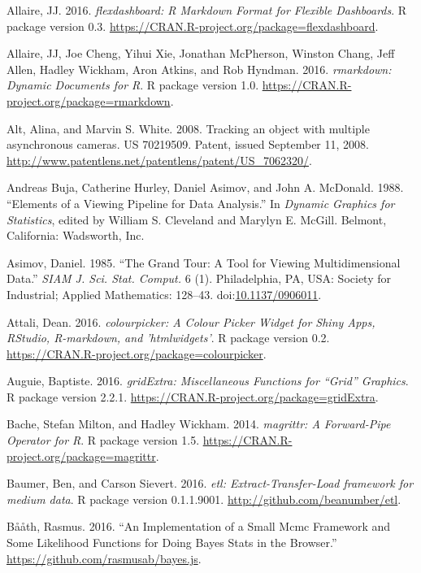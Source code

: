 \documentclass[12pt,]{isuthesis}
\begin{document}
\hypertarget{ref-flexdashboard}{}
Allaire, JJ. 2016. \emph{flexdashboard: R Markdown Format for Flexible
Dashboards}. R package version 0.3.
\url{https://CRAN.R-project.org/package=flexdashboard}.

\hypertarget{ref-rmarkdown}{}
Allaire, JJ, Joe Cheng, Yihui Xie, Jonathan McPherson, Winston Chang,
Jeff Allen, Hadley Wickham, Aron Atkins, and Rob Hyndman. 2016.
\emph{rmarkdown: Dynamic Documents for R}. R package version 1.0.
\url{https://CRAN.R-project.org/package=rmarkdown}.

\hypertarget{ref-patent}{}
Alt, Alina, and Marvin S. White. 2008. Tracking an object with multiple
asynchronous cameras. US 70219509. Patent, issued September 11, 2008.
\url{http://www.patentlens.net/patentlens/patent/US_7062320/}.

\hypertarget{ref-viewing-pipeline}{}
Andreas Buja, Catherine Hurley, Daniel Asimov, and John A. McDonald.
1988. ``Elements of a Viewing Pipeline for Data Analysis.'' In
\emph{Dynamic Graphics for Statistics}, edited by William S. Cleveland
and Marylyn E. McGill. Belmont, California: Wadsworth, Inc.

\hypertarget{ref-grand-tour}{}
Asimov, Daniel. 1985. ``The Grand Tour: A Tool for Viewing
Multidimensional Data.'' \emph{SIAM J. Sci. Stat. Comput.} 6 (1).
Philadelphia, PA, USA: Society for Industrial; Applied Mathematics:
128--43. doi:\href{https://doi.org/10.1137/0906011}{10.1137/0906011}.

\hypertarget{ref-colourpicker}{}
Attali, Dean. 2016. \emph{colourpicker: A Colour Picker Widget for Shiny
Apps, RStudio, R-markdown, and 'htmlwidgets'}. R package version 0.2.
\url{https://CRAN.R-project.org/package=colourpicker}.

\hypertarget{ref-gridExtra}{}
Auguie, Baptiste. 2016. \emph{gridExtra: Miscellaneous Functions for
``Grid'' Graphics}. R package version 2.2.1.
\url{https://CRAN.R-project.org/package=gridExtra}.

\hypertarget{ref-magrittr}{}
Bache, Stefan Milton, and Hadley Wickham. 2014. \emph{magrittr: A
Forward-Pipe Operator for R}. R package version 1.5.
\url{https://CRAN.R-project.org/package=magrittr}.

\hypertarget{ref-etl}{}
Baumer, Ben, and Carson Sievert. 2016. \emph{etl: Extract-Transfer-Load
framework for medium data}. R package version 0.1.1.9001.
\url{http://github.com/beanumber/etl}.

\hypertarget{ref-bayes-js}{}
Bååth, Rasmus. 2016. ``An Implementation of a Small Mcmc Framework and
Some Likelihood Functions for Doing Bayes Stats in the Browser.''
\url{https://github.com/rasmusab/bayes.js}.
\end{document}
